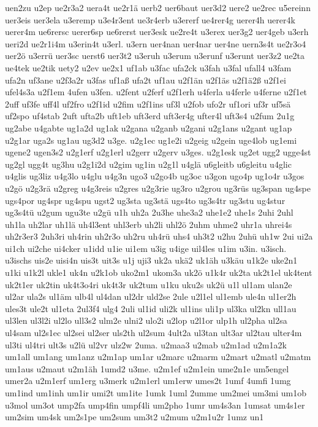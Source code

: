 {uen2zu
u2ep
ue2r3a2
uera4t
ue2r1ä
uerb2
uer6baut
uer3d2
uere2
ue2rec
u5ereinn
uer3eis
uer3ela
u3eremp
u3e4r3ent
ue3r4erb
u3ererf
ue4rer4g
uerer4h
uerer4k
uerer4m
ue6rersc
uerer6sp
ue6rerst
uer3esk
ue2re4t
u3erex
uer3g2
uer4geb
u3erh
ueri2d
ue2r1i4m
u3erin4t
u3erl.
u3ern
uer4nan
uer4nar
uer4ne
uern3s4t
ue2r3o4
uer2ö
u3errü
uer3sc
uerst6
uer3t2
u3eruh
u3erum
u3erunf
u3erunt
uer3z2
ue2ta
ue4tek
ue2tik
uety2
u2ev
ue2x1
uf1ab
u3fac
ufa2ck
u3fah
u3fal
ufall4
u3fam
ufa2n
uf3ane
u2f3a2r
u3fas
uf1aß
ufa2t
uf1au
u2f1än
u2f1äs
u2f1ä2ß
u2f1ei
ufel4s3a
u2f1em
4ufen
u3fen.
u2fent
u2ferf
u2f1erh
u4ferla
u4ferle
u4ferne
u2f1et
2uff
uf3fe
uff4l
uf2fro
u2f1id
u2fim
u2f1ins
uf3l
u2fob
ufo2r
uf1ori
uf3r
uf5sä
uf2spo
uf4stab
2uft
ufta2b
uft1eb
uft3erd
uft3er4g
ufter4l
uft3s4
u2fum
2u1g
ug2abe
u4gabte
ug1a2d
ug1ak
u2gana
u2ganb
u2gani
u2g1ans
u2gant
ug1ap
u2g1ar
uga2s
ug1au
ug3d2
u3ge.
u2g1ec
ug1e2i
u2geig
u2gein
uge4lob
ug1emi
ugene2
ugen3s2
u2g1erf
u2g1erl
u2gerr
u2gerv
u3ges.
u2g1esk
ug2et
ugg2
ugge4st
ug2gl
ugg4t
ug3hu
u2g1i2d
u2gim
ug1in
u2g1l
u4glä
u6gleitb
u6gleitu
u4glic
u4glis
ug3liz
u4g3lo
u4glu
u4g3n
ugo3
u2go4b
ug3oc
u3gon
ugo4p
ug1o4r
u3gos
u2gö
u2g3rä
u2greg
u4g3reis
u2gres
u2g3rie
ug3ro
u2grou
ug3rüs
ug3span
ug4spe
ugs4por
ug4spr
ug4spu
ugst2
ug3sta
ug3stä
ugs4to
ug3s4tr
ug3stu
ug4stur
ug3s4tü
u2gum
ugu3te
u2gü
u1h
uh2a
2u3he
uhe3a2
uhe1e2
uhe1s
2uhi
2uhl
uh1la
uh2lar
uh1lä
uh4l3ent
uhl3erb
uh2li
uhl2ö
2uhm
uhme2
uhr1a
uhrei4s
uh2r3er3
2uh3ri
uh4rin
uh2r3o
uh2ru
uh4rü
uhs4
uh3t2
u2hu
2uhü
uh1w
2ui
ui2a
ui1ch
ui2che
ui4cker
u1idd
u1ie
ui1em
u3ig
u4ige
uil4les
u1im
u3in.
u3isch.
u3ischs
uis2e
uisi4n
uis3t
uit3s
u1j
uji3
uk2a
ukä2
uk1äh
u3käu
u1k2e
uke2n1
u1ki
u1k2l
ukle1
uk4n
u2k1ob
uko2m1
ukom3a
uk2ö
u1k4r
uk2ta
uk2t1el
uk4tent
uk2t1er
uk2tin
uk4t3o4ri
uk4t3r
uk2tum
u1ku
uku2s
uk2ü
u1l
ul1am
ulan2e
ul2ar
ula2s
ul1äm
ulb4l
ul4dan
ul2dr
uld2se
2ule
u2l1el
ul1emb
ule4n
ul1er2h
ules3t
ule2t
ul1eta
2ul3f4
ulg4
2uli
ul1id
uli2k
ul1ins
uli1p
ul3ka
ul2kn
ull1au
ul3len
ul3l2i
ul2lo
ull3s2
ulm2e
ulni2
ulo2i
u2lop
u2l1or
ulp1h
ul2pha
ul2sa
ul4sam
ul2s1ec
ul2sei
ul2ser
uls2th
ul2sum
4ult2a
ul3tan
ult3ar
ul2tau
ulter4m
ul3ti
ul4tri
ult3s
u2lü
ul2vr
ulz2w
2uma.
u2maa3
u2mab
u2m1ad
u2m1a2k
um1all
um1ang
um1anz
u2m1ap
um1ar
u2marc
u2marm
u2mart
u2matl
u2matm
um1aus
u2maut
u2m1äh
1umd2
u3me.
u2m1ef
u2m1ein
ume2n1e
um5engel
umer2a
u2m1erf
um1erg
u3merk
u2m1erl
um1erw
umes2t
1umf
4umfi
1umg
um1ind
um1inh
um1ir
umi2t
um1ite
1umk
1uml
2umme
um2mei
um3mi
um1ob
u3mol
um3ot
ump2fa
ump4fin
umpf4li
um2pho
1umr
um4s3an
1umsat
um4s1er
um2sim
um4sk
um2s1pe
um2sum
um3t2
u2mum
u2m1u2r
1umz
un1
}
